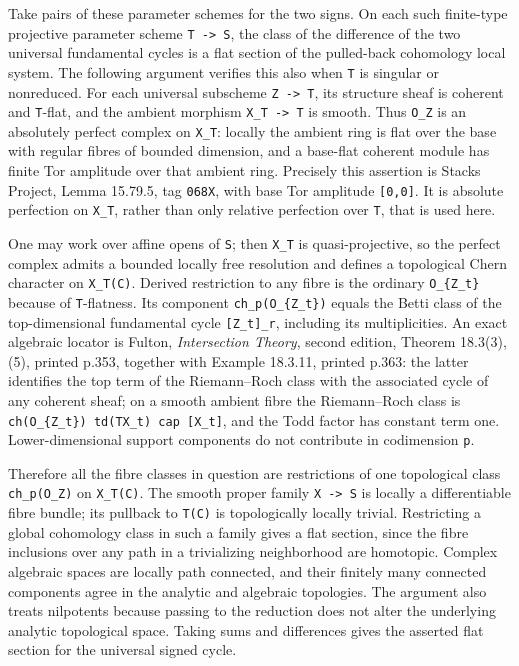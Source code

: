\documentclass[11pt,a4paper]{article}
\theoremstyle{definition}
\begin{document}
Take pairs of these parameter schemes for the two signs. On each such
finite-type projective parameter scheme \texttt{T\ -\textgreater{}\ S},
the class of the difference of the two universal fundamental cycles is a
flat section of the pulled-back cohomology local system. The following
argument verifies this also when \texttt{T} is singular or nonreduced.
For each universal subscheme \texttt{Z\ -\textgreater{}\ T}, its
structure sheaf is coherent and \texttt{T}-flat, and the ambient
morphism \texttt{X\_T\ -\textgreater{}\ T} is smooth. Thus \texttt{O\_Z}
is an absolutely perfect complex on \texttt{X\_T}: locally the ambient
ring is flat over the base with regular fibres of bounded dimension, and
a base-flat coherent module has finite Tor amplitude over that ambient
ring. Precisely this assertion is Stacks Project, Lemma 15.79.5, tag
\texttt{068X}, with base Tor amplitude \texttt{{[}0,0{]}}. It is
absolute perfection on \texttt{X\_T}, rather than only relative
perfection over \texttt{T}, that is used here.

One may work over affine opens of \texttt{S}; then \texttt{X\_T} is
quasi-projective, so the perfect complex admits a bounded locally free
resolution and defines a topological Chern character on
\texttt{X\_T(C)}. Derived restriction to any fibre is the ordinary
\texttt{O\_\{Z\_t\}} because of \texttt{T}-flatness. Its component
\texttt{ch\_p(O\_\{Z\_t\})} equals the Betti class of the
top-dimensional fundamental cycle \texttt{{[}Z\_t{]}\_r}, including its
multiplicities. An exact algebraic locator is Fulton, \emph{Intersection
Theory}, second edition, Theorem 18.3(3),(5), printed p.353, together
with Example 18.3.11, printed p.363: the latter identifies the top term
of the Riemann--Roch class with the associated cycle of any coherent
sheaf; on a smooth ambient fibre the Riemann--Roch class is
\texttt{ch(O\_\{Z\_t\})\ td(TX\_t)\ cap\ {[}X\_t{]}}, and the Todd
factor has constant term one. Lower-dimensional support components do
not contribute in codimension \texttt{p}.

Therefore all the fibre classes in question are restrictions of one
topological class \texttt{ch\_p(O\_Z)} on \texttt{X\_T(C)}. The smooth
proper family \texttt{X\ -\textgreater{}\ S} is locally a differentiable
fibre bundle; its pullback to \texttt{T(C)} is topologically locally
trivial. Restricting a global cohomology class in such a family gives a
flat section, since the fibre inclusions over any path in a trivializing
neighborhood are homotopic. Complex algebraic spaces are locally path
connected, and their finitely many connected components agree in the
analytic and algebraic topologies. The argument also treats nilpotents
because passing to the reduction does not alter the underlying analytic
topological space. Taking sums and differences gives the asserted flat
section for the universal signed cycle.
\end{document}
